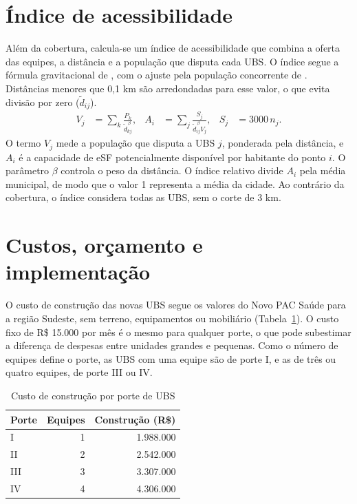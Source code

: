 \section{Índice de acessibilidade}
Além da cobertura, calcula-se um índice de acessibilidade que combina a oferta das equipes, a distância
e a população que disputa cada UBS. O índice segue a fórmula gravitacional de \citet{hansen1959}, com o
ajuste pela população concorrente de \citet{joseph1982}. Distâncias menores que 0,1 km são arredondadas
para esse valor, o que evita divisão por zero ($\widetilde d_{ij}$).
\begin{align}
V_j&=\sum_k\frac{P_k}{\widetilde d_{kj}^{\,\beta}}, &
A_i&=\sum_j\frac{S_j}{\widetilde d_{ij}^{\,\beta}V_j}, &S_j&=3000\,n_j.
\end{align}
O termo $V_j$ mede a população que disputa a UBS $j$, ponderada pela distância, e $A_i$ é a capacidade de
eSF potencialmente disponível por habitante do ponto $i$. O parâmetro $\beta$ controla o peso da
distância. O índice relativo divide $A_i$ pela média municipal, de modo que o valor 1 representa a média
da cidade. Ao contrário da cobertura, o índice considera todas as UBS, sem o corte de 3 km.

\section{Custos, orçamento e implementação}
O custo de construção das novas UBS segue os valores do Novo PAC Saúde para a região Sudeste, sem
terreno, equipamentos ou mobiliário (Tabela~\ref{tab:portes}). O custo fixo de R\$ 15.000 por mês é o
mesmo para qualquer porte, o que pode subestimar a diferença de despesas entre unidades grandes e
pequenas. Como o número de equipes define o porte, as UBS com uma equipe são de porte I, e as de três ou
quatro equipes, de porte III ou IV.

\begin{table}[htbp]\centering
\caption{Custo de construção por porte de UBS}\label{tab:portes}
\begin{tabular}{lrr}\toprule Porte & Equipes & Construção (R\$)\\\midrule
I & 1 & 1.988.000\\II & 2 & 2.542.000\\III & 3 & 3.307.000\\IV & 4 & 4.306.000\\\bottomrule
\end{tabular}
\end{table}

